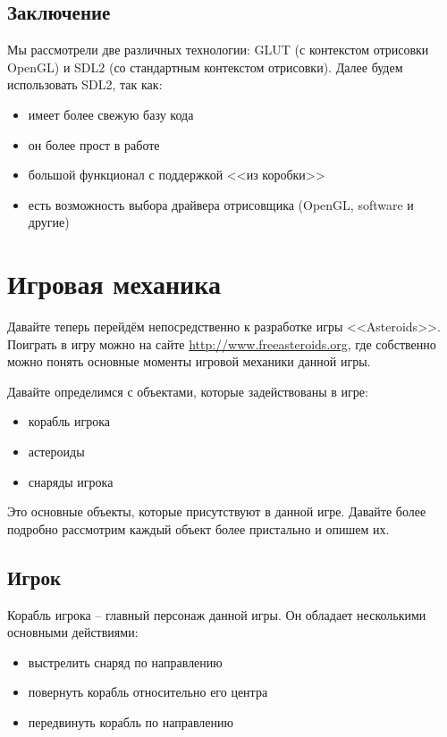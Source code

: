 \subsection{Заключение}
Мы рассмотрели две различных технологии: GLUT (с контекстом отрисовки OpenGL) и SDL2 (со стандартным 
контекстом отрисовки). Далее будем использовать SDL2, так как:
\begin{itemize}
    \item имеет более свежую базу кода
    \item он более прост в работе
    \item большой функционал с поддержкой <<из коробки>>
    \item есть возможность выбора драйвера отрисовщика (OpenGL, software и другие)
\end{itemize} 

\pagebreak

\section{Игровая механика}

Давайте теперь перейдём непосредственно к разработке игры <<Asteroids>>. Поиграть в игру можно на сайте 
\url{http://www.freeasteroids.org}, где собственно можно понять основные моменты игровой механики данной 
игры.

Давайте определимся с объектами, которые задействованы в игре:
\begin{itemize}
    \item корабль игрока
    \item астероиды
    \item снаряды игрока
\end{itemize}

Это основные объекты, которые присутствуют в данной игре. Давайте более подробно рассмотрим каждый объект 
более пристально и опишем их.

\subsection{Игрок}
Корабль игрока -- главный персонаж данной игры. Он обладает несколькими основными действиями:
\begin{itemize}
    \item выстрелить снаряд по направлению
    \item повернуть корабль относительно его центра
    \item передвинуть корабль по направлению
\end{itemize}

